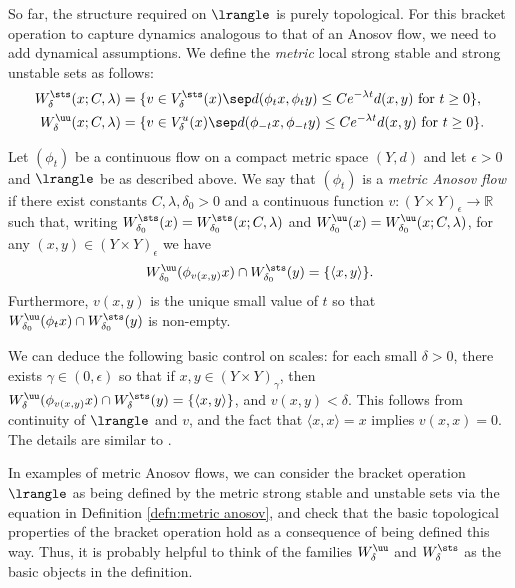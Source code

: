 So far, the structure required on $\lrangle$ is purely topological. For this bracket operation to capture dynamics analogous to that of an Anosov flow, we need to add dynamical assumptions.
We define the \emph{metric} local strong stable and strong unstable sets as follows:
\begin{align*}
W^{\sts}_\delta (x; C, \lambda) &= \{ v \in V^{\sts}_\delta (x) \sep d(\phi_t x, \phi_t y) \leq Ce^{-\lambda t}d(x,y) \text{ for } t \geq 0\},\\
W^{\uu}_\delta (x; C, \lambda) &= \{ v \in V^{u}_\delta (x) \sep d(\phi_{-t} x, \phi_{-t} y) \leq Ce^{-\lambda t}d(x,y) \text{ for } t \geq 0\}.
\end{align*}

\begin{defn}\label{defn:metric anosov}
Let $(\phi_t)$ be a continuous flow on a compact metric space $(Y,d)$ and let $\epsilon>0$ and $\lrangle$ be as described above. We say that $(\phi_t)$ is a \emph{metric Anosov flow} if there exist constants $C, \lambda, \delta_0>0$ and a continuous function $v\colon(Y\times Y)_\epsilon \to \mathbb{R}$ such that, writing $W^{\sts}_{\delta_0} (x) = W^{\sts}_{\delta_0} (x; C, \lambda)$ and $W^{\uu}_{\delta_0} (x) = W^{\uu}_{\delta_0} (x; C, \lambda)$, for any $(x, y) \in (Y \times Y)_\epsilon$ we have
\[ W^{\uu}_{\delta_0}(\phi_{v(x,y)}x) \cap W^{\sts}_{\delta_0}(y) = \{\langle x,y\rangle \}. \]
Furthermore, $v(x,y)$ is the unique small value of $t$ so that $W^{\uu}_{\delta_0}(\phi_{t}x) \cap W^{\sts}_{\delta_0}(y)$ is non-empty.
\end{defn}

We can deduce the following basic control on scales: for each small $\delta>0$, there exists $\gamma\in(0, \epsilon)$ so that if $x,y \in (Y \times Y)_{\gamma}$, then $W^{\uu}_{\delta}(\phi_{v(x,y)}x) \cap W^{\sts}_{\delta}(y) = \{\langle x,y\rangle\}$, and $v(x,y)<\delta$. This follows from continuity of $\lrangle $ and $v$, and the fact that $\langle x,x\rangle =x$ implies $v(x,x)=0$. The details are similar to \cite[Lem.\,1.5]{bowen-periodic}.

In examples of metric Anosov flows, we can consider the bracket operation $\lrangle$ as being defined by the metric strong stable and unstable sets via the equation in Definition \ref{defn:metric anosov}, and check that the basic topological properties of the bracket operation hold as a consequence of being defined this way. Thus, it is probably helpful to think of the families $W^{\uu}_\delta$ and $W^{\sts}_\delta$ as the basic objects in the definition.

